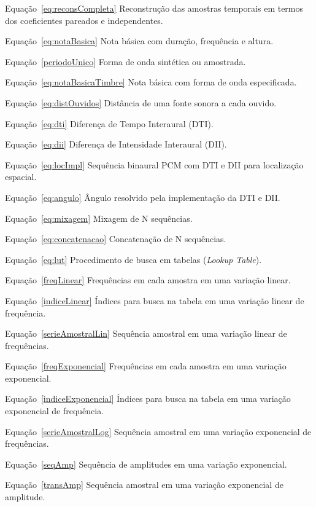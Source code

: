 \begin{listaespecial}[BIGNAMEWIDTH]
        \item[Equação~\ref{eq:reconsCompleta}] Reconstrução das amostras temporais em termos dos coeficientes pareados e independentes.
        \item[Equação~\ref{eq:notaBasica}] Nota básica com duração, frequência e altura.
        \item[Equação~\ref{periodoUnico}] Forma de onda sintética ou amostrada.
        \item[Equação~\ref{eq:notaBasicaTimbre}] Nota básica com forma de onda especificada.
        \item[Equação~\ref{eq:distOuvidos}] Distância de uma fonte sonora a cada ouvido.
        \item[Equação~\ref{eq:dti}] Diferença de Tempo Interaural (DTI).
        \item[Equação~\ref{eq:dii}] Diferença de Intensidade Interaural (DII).
        \item[Equação~\ref{eq:locImpl}] Sequência binaural PCM com  DTI e DII para localização espacial.
        \item[Equação~\ref{eq:angulo}] Ângulo resolvido pela implementação da DTI e DII.
        \item[Equação~\ref{eq:mixagem}] Mixagem de N sequências.
        \item[Equação~\ref{eq:concatenacao}] Concatenação de N sequências.
        \item[Equação~\ref{eq:lut}] Procedimento de busca em tabelas (\emph{Lookup Table}).
        \item[Equação~\ref{freqLinear}] Frequências em cada amostra em uma variação linear.
        \item[Equação~\ref{indiceLinear}] Índices para busca na tabela em uma variação linear de frequência.
        \item[Equação~\ref{serieAmostralLin}] Sequência amostral em uma variação linear de frequências.
        \item[Equação~\ref{freqExponencial}] Frequências em cada amostra em uma variação exponencial.
        \item[Equação~\ref{indiceExponencial}] Índices para busca na tabela em uma variação exponencial de frequência.
        \item[Equação~\ref{serieAmostralLog}] Sequência amostral em uma variação exponencial de frequências.
        \item[Equação~\ref{seqAmp}] Sequência de amplitudes em uma variação exponencial.
        \item[Equação~\ref{transAmp}] Sequência amostral em uma variação exponencial de amplitude.

\end{listaespecial}
